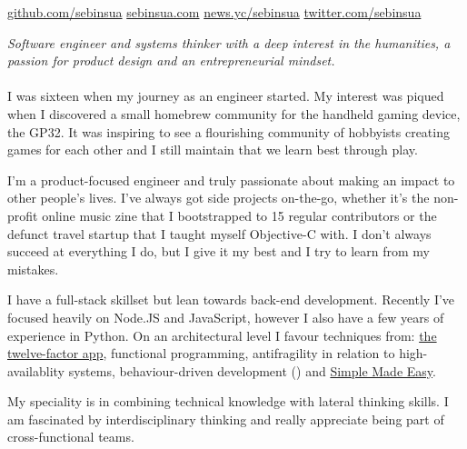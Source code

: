 \documentclass[10pt,a4paper]{article}
\begin{document}
\sloppy  %


\nobreakvspace{0.3em}  %

\noindent\href{http://github.com/sebinsua}{github.com/sebinsua}\sbull
\href{http://sebinsua.com}{sebinsua.com}\sbull
\href{https://news.ycombinator.com/user?id=lhnz}{news.yc/sebinsua}\sbull
\href{http://twitter.com/sebinsua}{twitter.com/sebinsua}\sbull

\spacedhrule{0.9em}{-0.4em}  %


\vspace{-1.3em}  %
\begin{multicols}{2}  %
\noindent \emph{Software engineer and systems thinker with a deep interest in the humanities, a passion for product design and an entrepreneurial mindset.}
\\
\\
I was sixteen when my journey as an engineer started. My interest was piqued when I discovered a small homebrew community for the handheld gaming device, the GP32. It was inspiring to see a flourishing community of hobbyists creating games for each other and I still maintain that we learn best through play.\newline

I'm a product-focused engineer and truly passionate about making an impact to other people's lives. I've always got side projects on-the-go, whether it's the non-profit online music zine that I bootstrapped to 15 regular contributors or the defunct travel startup that I taught myself Objective-C with. I don't always succeed at everything I do, but I give it my best and I try to learn from my mistakes.\newline

I have a full-stack skillset but lean towards back-end development. Recently I've focused heavily on Node.JS and JavaScript, however I also have a few years of experience in Python. On an architectural level I favour techniques from: \href{http://12factor.net}{the twelve-factor app}, functional programming, antifragility in relation to high-availablity systems, behaviour-driven development () and \href{http://infoq.com/presentations/Simple-Made-Easy}{Simple Made Easy}.\newline

My speciality is in combining technical knowledge with lateral thinking skills. I am fascinated by interdisciplinary thinking and really appreciate being part of cross-functional teams.

\end{multicols}
\end{document}
